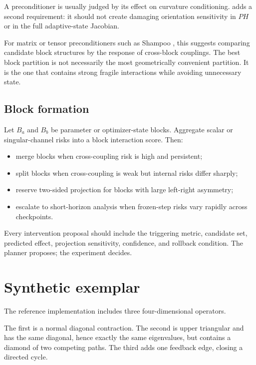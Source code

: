 A preconditioner is usually judged by its effect on curvature conditioning.  \cps{} adds a second requirement: it should not create damaging orientation sensitivity in \(PH\) or in the full adaptive-state Jacobian.

For matrix or tensor preconditioners such as Shampoo \cite{gupta2018}, this suggests comparing candidate block structures by the response of cross-block couplings.  The best block partition is not necessarily the most geometrically convenient partition.  It is the one that contains strong fragile interactions while avoiding unnecessary state.

\subsection{Block formation}

Let \(B_a\) and \(B_b\) be parameter or optimizer-state blocks.  Aggregate scalar or singular-channel risks into a block interaction score.  Then:
\begin{itemize}[leftmargin=1.5em]
\item merge blocks when cross-coupling risk is high and persistent;
\item split blocks when cross-coupling is weak but internal risks differ sharply;
\item reserve two-sided projection for blocks with large left-right asymmetry;
\item escalate to short-horizon analysis when frozen-step risks vary rapidly across checkpoints.
\end{itemize}

Every intervention proposal should include the triggering metric, candidate set, predicted effect, projection sensitivity, confidence, and rollback condition.  The planner proposes; the experiment decides.

\section{Synthetic exemplar}
\label{sec:synthetic}

The reference implementation includes three four-dimensional operators.

The first is a normal diagonal contraction.  The second is upper triangular and has the same diagonal, hence exactly the same eigenvalues, but contains a diamond of two competing paths.  The third adds one feedback edge, closing a directed cycle.

